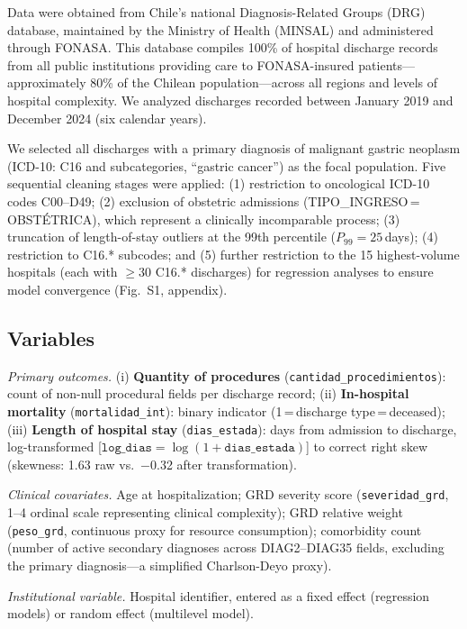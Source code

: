 \documentclass[10pt,twocolumn]{article}
\begin{document}
Data were obtained from Chile's national Diagnosis-Related Groups (DRG) database,
maintained by the Ministry of Health (MINSAL) and administered through FONASA.
This database compiles 100\% of hospital discharge records from all public institutions
providing care to FONASA-insured patients—approximately 80\% of the Chilean
population—across all regions and levels of hospital complexity. We analyzed discharges
recorded between January 2019 and December 2024 (six calendar years).

We selected all discharges with a primary diagnosis of malignant gastric neoplasm
(ICD-10: C16 and subcategories, ``gastric cancer'') as the focal population. Five
sequential cleaning stages were applied: (1) restriction to oncological ICD-10 codes
C00–D49; (2) exclusion of obstetric admissions (TIPO\_INGRESO\,=\,OBSTÉTRICA),
which represent a clinically incomparable process; (3) truncation of length-of-stay
outliers at the 99th percentile ($P_{99} = 25$\,days); (4) restriction to C16.*
subcodes; and (5) further restriction to the 15 highest-volume hospitals (each with
$\geq 30$ C16.* discharges) for regression analyses to ensure model convergence
(Fig.~S1, appendix).

\subsection{Variables}

\textit{Primary outcomes.} (i) \textbf{Quantity of procedures} (\texttt{cantidad\_pro\-ce\-di\-mien\-tos}): count of non-null procedural fields per discharge record;
(ii) \textbf{In-hospital mortality} (\texttt{mortalidad\_int}): binary indicator
(1\,=\,discharge type\,=\,deceased); (iii) \textbf{Length of hospital stay}
(\texttt{dias\_estada}): days from admission to discharge, log-transformed
[$\texttt{log\_dias} = \log(1 + \texttt{dias\_estada})$] to correct right skew
(skewness: 1.63 raw vs.\ $-$0.32 after transformation).

\textit{Clinical covariates.} Age at hospitalization; GRD severity score
(\texttt{se\-ve\-ri\-dad\_grd}, 1–4 ordinal scale representing clinical complexity);
GRD relative weight (\texttt{pe\-so\_grd}, continuous proxy for resource consumption);
comorbidity count (number of active secondary diagnoses across DIAG2–DIAG35 fields,
excluding the primary diagnosis—a simplified Charlson-Deyo proxy).

\textit{Institutional variable.} Hospital identifier, entered as a fixed effect
(regression models) or random effect (multilevel model).
\end{document}

